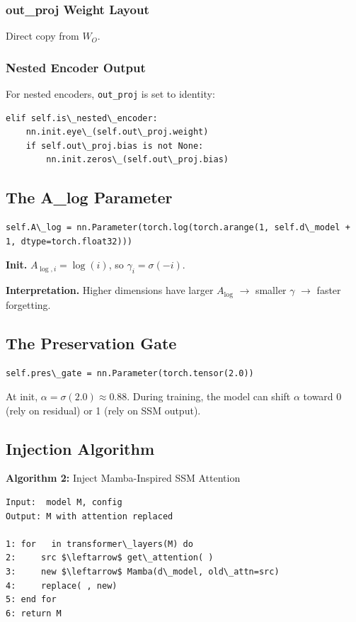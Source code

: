 \subsubsection{out\_proj Weight Layout}

Direct copy from $W_O$.

\subsubsection{Nested Encoder Output}

For nested encoders, \texttt{out\_proj} is set to identity:

\begin{lstlisting}
elif self.is\_nested\_encoder:
    nn.init.eye\_(self.out\_proj.weight)
    if self.out\_proj.bias is not None:
        nn.init.zeros\_(self.out\_proj.bias)
\end{lstlisting}

\subsection{The A\_log Parameter}

\begin{lstlisting}
self.A\_log = nn.Parameter(torch.log(torch.arange(1, self.d\_model + 1, dtype=torch.float32)))
\end{lstlisting}

\textbf{Init.} $A_{\log, i} = \log(i)$, so $\gamma_i = \sigma(-i)$.

\textbf{Interpretation.} Higher dimensions have larger $A_{\log}$ $\to$ smaller $\gamma$ 
$\to$ faster forgetting.

\subsection{The Preservation Gate}

\begin{lstlisting}
self.pres\_gate = nn.Parameter(torch.tensor(2.0))
\end{lstlisting}

At init, $\alpha = \sigma(2.0) \approx 0.88$. During training, the model can 
shift $\alpha$ toward 0 (rely on residual) or 1 (rely on SSM output).

\subsection{Injection Algorithm}

\textbf{Algorithm 2:} Inject Mamba-Inspired SSM Attention
\begin{lstlisting}
Input:  model M, config
Output: M with attention replaced

1: for   in transformer\_layers(M) do
2:     src $\leftarrow$ get\_attention( )
3:     new $\leftarrow$ Mamba(d\_model, old\_attn=src)
4:     replace( , new)
5: end for
6: return M
\end{lstlisting}

